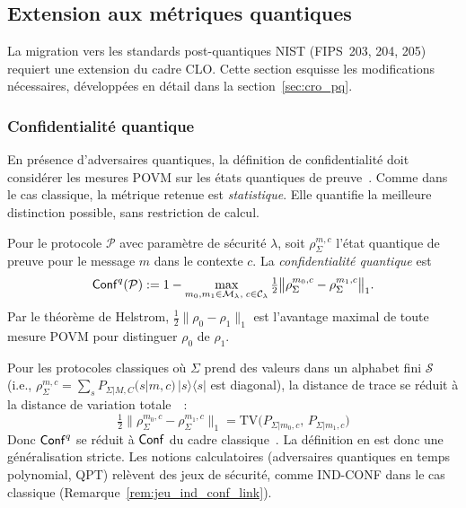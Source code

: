 \subsection{Extension aux m\'etriques quantiques}
\label{subsec:extension_postquantique}
\begin{sloppypar}
La migration vers les standards post-quantiques NIST (FIPS~203, 204, 205)~\cite{NISTPQC,NISTPostQuantum2022}
requiert une extension du cadre CLO. Cette section esquisse les modifications
n\'ecessaires, d\'evelopp\'ees en d\'etail dans la section~\ref{sec:cro_pq}.

\subsubsection{Confidentialit\'e quantique}
\label{subsubsec:conf_quantique}

En pr\'esence d'adversaires quantiques, la d\'efinition de confidentialit\'e
doit consid\'erer les mesures POVM sur les \'etats quantiques de
preuve~\cite{Watrous2009,Boneh2011,Zhandry}. Comme dans le cas classique, la
m\'etrique retenue est \emph{statistique}. Elle quantifie la meilleure
distinction possible, sans restriction de calcul.

\begin{definition}\label{def:conf_quantique_clo}
Pour le protocole $\mathcal{P}$ avec param\`etre de s\'ecurit\'e $\lambda$, soit
$\rho_\Sigma^{m,c}$ l'\'etat quantique de preuve pour le message $m$ dans le
contexte $c$. La \emph{confidentialit\'e quantique} est
\begin{equation}
\mathsf{Conf}^q(\mathcal{P}) := 1 - \max_{m_0,m_1 \in \mathcal{M}_\lambda,\; c \in \mathcal{C}_\lambda}
\tfrac{1}{2}\bigl\|\rho_\Sigma^{m_0,c} - \rho_\Sigma^{m_1,c}\bigr\|_1 .
\label{eq:conf_q}
\end{equation}
Par le th\'eor\`eme de Helstrom, $\tfrac12\|\rho_0-\rho_1\|_1$ est l'avantage
maximal de toute mesure POVM pour distinguer $\rho_0$ de $\rho_1$.
\end{definition}

\begin{remark}
\label{rem:compatibilite_conf}
Pour les protocoles classiques o\`u $\Sigma$ prend des valeurs dans un alphabet
fini $\mathcal{S}$ (i.e., $\rho_\Sigma^{m,c} = \sum_{s} P_{\Sigma|M,C}(s|m,c)\,|s\rangle\langle s|$
est diagonal), la distance de trace se r\'eduit \`a la distance de variation totale~\cite{Levin,Pinsker1964}~:
\begin{equation}
\tfrac{1}{2}\|\rho_\Sigma^{m_0,c} - \rho_\Sigma^{m_1,c}\|_1
= \mathrm{TV}\!\bigl(P_{\Sigma|m_0,c},\, P_{\Sigma|m_1,c}\bigr)
\end{equation}
Donc $\mathsf{Conf}^q$ se r\'eduit \`a $\mathsf{Conf}$ du cadre classique~\cite{MINKA2026CLO}. La
d\'efinition en est donc une g\'en\'eralisation stricte. Les notions calculatoires
(adversaires quantiques en temps polynomial, QPT) rel\`event des jeux de s\'ecurit\'e, comme IND-CONF dans le
cas classique (Remarque~\ref{rem:jeu_ind_conf_link}).
\end{remark}


\end{sloppypar}
